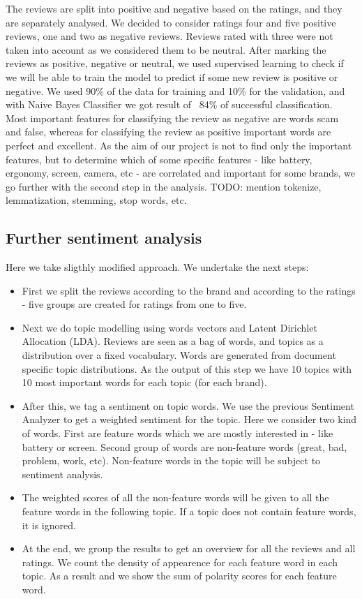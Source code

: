 \documentclass[11pt]{article}
\begin{document}
The reviews are split into positive and negative based on the ratings, and they are separately analysed. We decided to consider ratings four and five positive reviews, one and two as negative reviews. Reviews rated with three were not taken into account as we considered them to be neutral. After marking the reviews as positive, negative or neutral, we used supervised learning to check if we will be able to train the model to predict if some new review is positive or negative. We used 90\% of the data for training and 10\% for the validation, and with Naive Bayes Classifier we got result of ~84\% of successful classification. Most important features for classifying the review as negative are words scam and false, whereas for classifying the review as positive important words are perfect and excellent. As the aim of our project is not to find only the important features, but to determine which of some specific features - like battery, ergonomy, screen, camera, etc - are correlated and important for some brands, we go further with the second step in the analysis. 
TODO: mention tokenize, lemmatization, stemming, stop words, etc. 


\subsection{Further sentiment analysis} 

Here we take sligthly modified approach. We undertake the next steps: 

 \begin{itemize}
  \item First we split the reviews according to the brand and according to the ratings - five groups are created for ratings from one to five.
  \item Next we do topic modelling using words vectors and Latent Dirichlet Allocation (LDA). Reviews are seen as a bag of words, and topics as a distribution over a fixed vocabulary. Words are generated from document specific topic distributions. As the output of this step we have 10 topics with 10 most important words for each topic (for each brand).
  \item After this, we tag a sentiment on topic words. We use the previous Sentiment Analyzer to get a weighted sentiment for the topic. Here we consider two kind of words. First are feature words which we are mostly interested in - like battery or screen. Second group of words are non-feature words (great, bad, problem, work, etc). Non-feature words in the topic will be subject to sentiment analysis. 
  \item The weighted scores of all the non-feature words will be given to all the feature words in the following topic. If a topic does not contain feature words, it is ignored.
  \item At the end, we group the results to get an overview for all the reviews and all ratings. We count the density of appearence for each feature word in each topic. As a result and we show the sum of polarity scores for each feature word.
\end{itemize}
\end{document}

